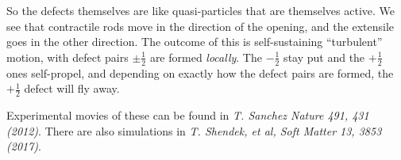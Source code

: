 \documentclass[a4paper]{article}
\begin{document}
So the defects themselves are like quasi-particles that are themselves active. We see that contractile rods move in the direction of the opening, and the extensile goes in the other direction. The outcome of this is self-sustaining ``turbulent'' motion, with defect pairs $\pm \frac{1}{2}$ are formed \emph{locally}. The $-\frac{1}{2}$ stay put and the $+\frac{1}{2}$ ones self-propel, and depending on exactly how the defect pairs are formed, the $+\frac{1}{2}$ defect will fly away.

Experimental movies of these can be found in \emph{T. Sanchez Nature 491, 431 (2012)}. There are also simulations in \emph{T. Shendek, et al, Soft Matter 13, 3853 (2017)}.

\printindex
\end{document}

